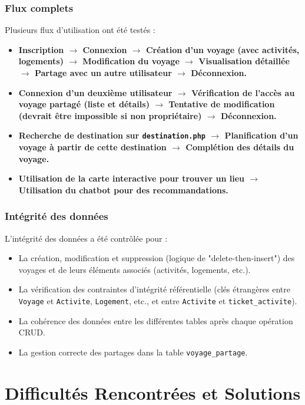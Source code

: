 \documentclass[a4paper,12pt]{article}
\begin{document}
\subsubsection{Flux complets}
Plusieurs flux d’utilisation ont été testés :
\begin{itemize}
  \item \textbf{Inscription $\rightarrow$ Connexion $\rightarrow$ Création d’un voyage (avec activités, logements) $\rightarrow$ Modification du voyage $\rightarrow$ Visualisation détaillée $\rightarrow$ Partage avec un autre utilisateur $\rightarrow$ Déconnexion.}
  \item \textbf{Connexion d'un deuxième utilisateur $\rightarrow$ Vérification de l'accès au voyage partagé (liste et détails) $\rightarrow$ Tentative de modification (devrait être impossible si non propriétaire) $\rightarrow$ Déconnexion.}
  \item \textbf{Recherche de destination sur \texttt{destination.php} $\rightarrow$ Planification d’un voyage à partir de cette destination $\rightarrow$ Complétion des détails du voyage.}
  \item \textbf{Utilisation de la carte interactive pour trouver un lieu $\rightarrow$ Utilisation du chatbot pour des recommandations.}
\end{itemize}

\subsubsection{Intégrité des données}
L'intégrité des données a été contrôlée pour :
\begin{itemize}
  \item La création, modification et suppression (logique de "delete-then-insert") des voyages et de leurs éléments associés (activités, logements, etc.).
  \item La vérification des contraintes d'intégrité référentielle (clés étrangères entre \texttt{Voyage} et \texttt{Activite}, \texttt{Logement}, etc., et entre \texttt{Activite} et \texttt{ticket\_activite}).
  \item La cohérence des données entre les différentes tables après chaque opération CRUD.
  \item La gestion correcte des partages dans la table \texttt{voyage\_partage}.
\end{itemize}
\section{Difficultés Rencontrées et Solutions}
\end{document}
